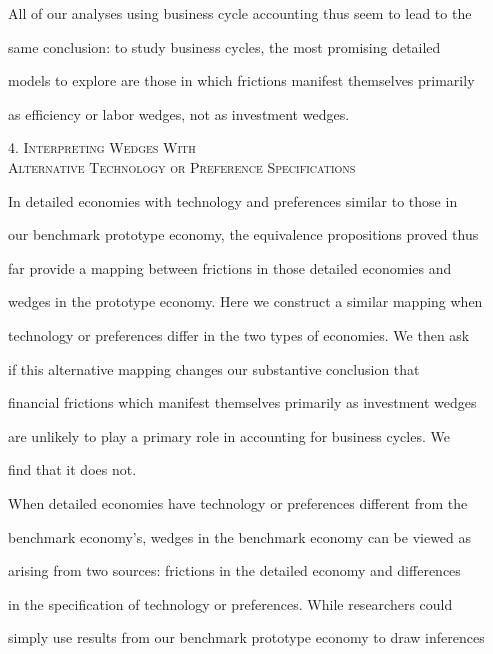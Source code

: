 \documentclass[fleqn,leqno,11pt]{article}
\begin{document}
All of our analyses using business cycle accounting thus seem to lead to the

same conclusion: to study business cycles, the most promising detailed

models to explore are those in which frictions manifest themselves primarily

as efficiency or labor wedges, not as investment wedges.



\bigskip



\begin{center}

4. \textsc{Interpreting Wedges With }\\[0pt]

\textsc{Alternative Technology or Preference Specifications}

\end{center}



In detailed economies with technology and preferences similar to those in

our benchmark prototype economy, the equivalence propositions proved thus

far provide a mapping between frictions in those detailed economies and

wedges in the prototype economy. Here we construct a similar mapping when

technology or preferences differ in the two types of economies. We then ask

if this alternative mapping changes our substantive conclusion that

financial frictions which manifest themselves primarily as investment wedges

are unlikely to play a primary role in accounting for business cycles. We

find that it does not.



When detailed economies have technology or preferences different from the

benchmark economy's, wedges in the benchmark economy can be viewed as

arising from two sources: frictions in the detailed economy and differences

in the specification of technology or preferences. While researchers could

simply use results from our benchmark prototype economy to draw inferences
\end{document}

